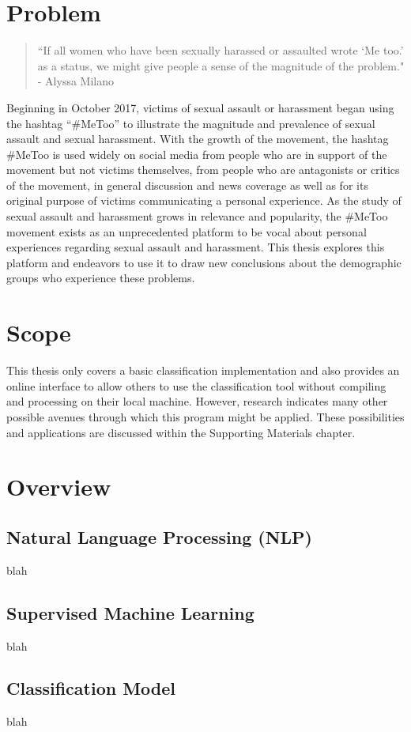 \section{Problem}

\begin{quote}
``If all women who have been sexually harassed or assaulted wrote `Me too.' as a status, we might give people a sense of the magnitude of the problem." - Alyssa Milano
\end{quote}

Beginning in October 2017, victims of sexual assault or harassment began using the hashtag “\#MeToo” to illustrate the magnitude and prevalence of sexual assault and sexual harassment. With the growth of the movement, the hashtag \#MeToo is used widely on social media from people who are in support of the movement but not victims themselves, from people who are antagonists or critics of the movement, in general discussion and news coverage as well as for its original purpose of victims communicating a personal experience. As the study of sexual assault and harassment grows in relevance and popularity, the \#MeToo movement exists as an unprecedented platform to be vocal about personal experiences regarding sexual assault and harassment. This thesis explores this platform and endeavors to use it to draw new conclusions about the demographic groups who experience these problems.

\section{Scope}

This thesis only covers a basic classification implementation and also provides an online interface to allow others to use the classification tool without compiling and processing on their local machine. However, research indicates many other possible avenues through which this program might be applied. These possibilities and applications are discussed within the Supporting Materials chapter.

\section{Overview}

\subsection{Natural Language Processing (NLP)}

blah

\subsection{Supervised Machine Learning}

blah

\subsection{Classification Model}

blah

